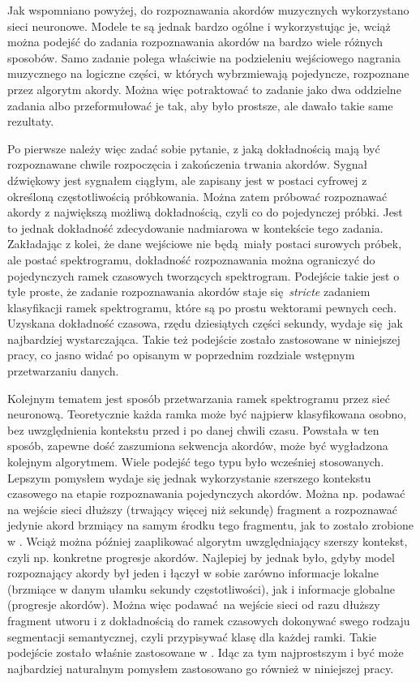 Jak wspomniano powyżej, do rozpoznawania akordów muzycznych wykorzystano sieci neuronowe. Modele te są jednak bardzo ogólne i wykorzystując je, wciąż można podejść do zadania rozpoznawania akordów na bardzo wiele różnych sposobów. Samo zadanie polega właściwie na podzieleniu wejściowego nagrania muzycznego na logiczne części, w których wybrzmiewają pojedyncze, rozpoznane przez algorytm akordy.  Można więc potraktować to zadanie jako dwa oddzielne zadania albo przeformułować je tak, aby było prostsze, ale dawało takie same rezultaty. 

Po pierwsze należy więc zadać sobie pytanie, z jaką dokładnością mają być rozpoznawane chwile rozpoczęcia i zakończenia trwania akordów. Sygnał dźwiękowy jest sygnałem ciągłym, ale zapisany jest w postaci cyfrowej z określoną częstotliwością próbkowania. Można zatem próbować rozpoznawać akordy z największą możliwą dokładnością, czyli co do pojedynczej próbki. Jest to jednak dokładność zdecydowanie nadmiarowa w kontekście tego zadania. Zakładając z kolei, że dane wejściowe nie będą miały postaci surowych próbek, ale postać spektrogramu, dokładność rozpoznawania można ograniczyć do pojedynczych ramek czasowych tworzących spektrogram. Podejście takie jest o tyle proste, że zadanie rozpoznawania akordów staje się \emph{stricte} zadaniem klasyfikacji ramek spektrogramu, które są po prostu wektorami pewnych cech. Uzyskana dokładność czasowa, rzędu dziesiątych części sekundy, wydaje się jak najbardziej wystarczająca. Takie też podejście zostało zastosowane w niniejszej pracy, co jasno widać po opisanym w poprzednim rozdziale wstępnym przetwarzaniu danych.

Kolejnym tematem jest sposób przetwarzania ramek spektrogramu przez sieć neuronową. Teoretycznie każda ramka może być najpierw klasyfikowana osobno, bez uwzględnienia kontekstu przed i po danej chwili czasu. Powstała w ten sposób, zapewne dość zaszumiona sekwencja akordów, może być wygładzona kolejnym algorytmem. Wiele podejść tego typu było wcześniej stosowanych. Lepszym pomysłem wydaje się jednak wykorzystanie szerszego kontekstu czasowego na etapie rozpoznawania pojedynczych akordów.  Można np.  podawać na wejście sieci dłuższy (trwający więcej niż sekundę) fragment a rozpoznawać jedynie akord brzmiący na samym środku tego fragmentu, jak to zostało zrobione w \cite{korzeniowski_fully_2016}.  Wciąż można później zaaplikować algorytm uwzględniający szerszy kontekst, czyli np. konkretne progresje akordów. Najlepiej by jednak było, gdyby model rozpoznający akordy był jeden i łączył w sobie zarówno informacje lokalne (brzmiące w danym ułamku sekundy częstotliwości), jak i informacje globalne (progresje akordów). Można więc podawać na wejście sieci od razu dłuższy fragment utworu i z dokładnością do ramek czasowych dokonywać swego rodzaju segmentacji semantycznej, czyli przypisywać klasę dla każdej ramki. Takie podejście zostało właśnie zastosowane w \cite{park_bi-directional_2019}. Idąc za tym najprostszym i być może najbardziej naturalnym pomysłem zastosowano go również w niniejszej pracy. 



